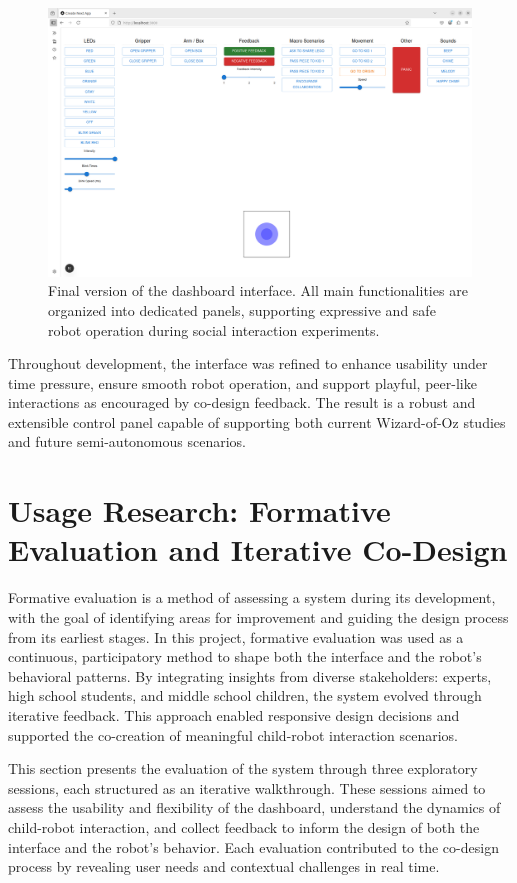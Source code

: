 \documentclass[a4paper]{usiinfbachelorproject}
\begin{document}
\begin{figure}[H]
    \centering
    \includegraphics[width=\linewidth]{figures/dashboard_v3.png}
    \caption{Final version of the dashboard interface. All main functionalities are organized into dedicated panels, supporting expressive and safe robot operation during social interaction experiments.}
    \label{fig:dashboard-v3-desc}
\end{figure}

Throughout development, the interface was refined to enhance usability under time pressure, ensure smooth robot operation, and support playful, peer-like interactions as encouraged by co-design feedback.
The result is a robust and extensible control panel capable of supporting both current Wizard-of-Oz studies and future semi-autonomous scenarios.

\section{\textbf{Usage Research: Formative Evaluation and Iterative Co-Design}}\label{sec:evaluation}
Formative evaluation is a method of assessing a system during its development, with the goal of identifying areas for improvement and guiding the design process from its earliest stages.
In this project, formative evaluation was used as a continuous, participatory method to shape both the interface and the robot's behavioral patterns.
By integrating insights from diverse stakeholders: experts, high school students, and middle school children, the system evolved through iterative feedback.
This approach enabled responsive design decisions and supported the co-creation of meaningful child-robot interaction scenarios.

This section presents the evaluation of the system through three exploratory sessions, each structured as an iterative walkthrough.
These sessions aimed to assess the usability and flexibility of the dashboard, understand the dynamics of child-robot interaction, and collect feedback to inform the design of both the interface and the robot's behavior.
Each evaluation contributed to the co-design process by revealing user needs and contextual challenges in real time.
\end{document}
